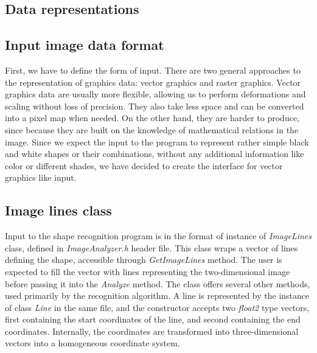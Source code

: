 \begin{description}
\section{Data representations}

\subsection{Input image data format}
First, we have to define the form of input. There are two general approaches to the representation of graphics data: vector graphics and raster graphics. Vector graphics data are usually more flexible, allowing us to perform deformations and scaling without loss of precision. They also take less space and can be converted into a pixel map when needed. On the other hand, they are harder to produce, since because they are built on the knowledge of mathematical relations in the image. Since we expect the input to the program to represent rather simple black and white shapes or their combinations, without any additional information like color or different shades, we have decided to create the interface for vector graphics like input.

\subsection{Image lines class}
Input to the shape recognition program is in the format of instance of \emph{ImageLines} class, defined in \emph{ImageAnalyzer.h} header file. This class wraps a vector of lines defining the shape, accessible through \emph{GetImageLines} method. The user is expected to fill the vector with lines representing the two-dimensional image before passing it into the \emph{Analyze} method. The class offers several other methods, used primarily by the recognition algorithm. 
A line is represented by the instance of class \emph{Line} in the same file, and the constructor accepts two \emph{float2} type vectors, first containing the start coordinates of the line, and second containing the end coordinates. Internally, the coordinates are transformed into three-dimensional vectors into a homogeneous coordinate system. 


\end{description}
